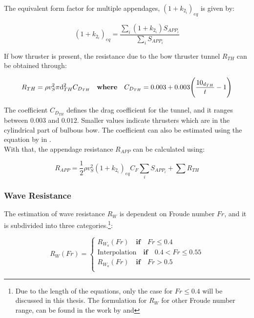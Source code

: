 The equivalent form factor for multiple appendages, $(1+k_{2_i})_{eq}$ is given by:

\begin{equation}\label{eqn:k2eq}
    (1+k_{2_i})_{eq} = \frac{\sum_i(1+k_{2_i})S_{APP_i}}{\sum_iS_{APP_i}}
\end{equation}

If bow thruster is present, the resistance due to the bow thruster tunnel $R_{TH}$ can be obtained through:

\begin{equation}\label{eqn:R_th}
    R_{TH} = \rho v_S^2 \pi \d_{TH}^2 C_{D_{TH}} \quad \textbf{where} \quad C_{D_{TH}} = 0.003 + 0.003 \Biggl( \frac{10_{d_{TH}}}{t} - 1 \Biggr) 
\end{equation}

The coefficient $C_{D_{TH}}$ defines the drag coefficient for the tunnel, and it ranges between $0.003$ and $0.012$. Smaller values indicate thrusters which are in the cylindrical part of bulbous bow. The coefficient can also be estimated using the equation by  in .\\

With that, the appendage resistance $R_{APP}$ can be calculated using:

\begin{equation}\label{R_app}
    R_{APP} = \frac{1}{2}\rho v_S^2 (1+k_{2_i})_{eq} C_F \sum_i S_{APP_i} + \sum R_{TH}
\end{equation}

\subsubsection*{Wave Resistance}

The estimation of wave resistance $R_W$ is dependent on Froude number $Fr$, and it is subdivided into three categories.\footnote{Due to the length of the equations, only the case for $Fr \leqslant 0.4$ will be discussed in this thesis. The formulation for $R_W$ for other Froude number range, can be found in the work by  and }:

\begin{equation}
    R_W(Fr) = \begin{cases}
        R_{W_a}(Fr) \quad \textbf{if} \quad Fr \leqslant 0.4 \\
        \text{Interpolation} \quad \textbf{if} \quad 0.4 < Fr \leqslant 0.55 \\
        R_{W_a}(Fr) \quad \textbf{if} \quad Fr > 0.5 \\
    \end{cases}
\end{equation}

















